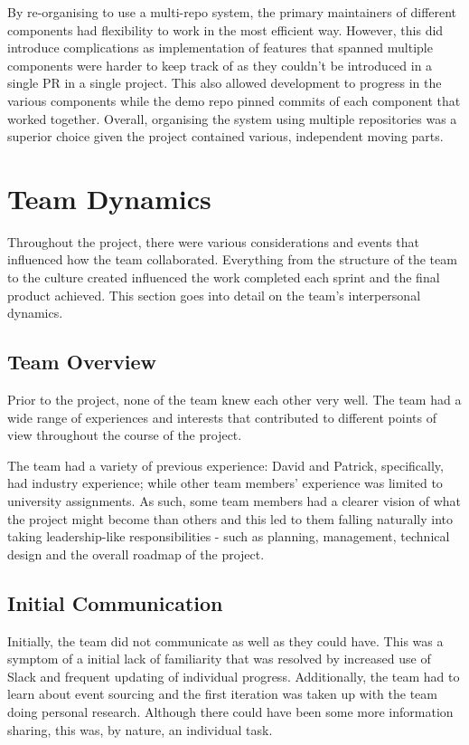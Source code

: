 \documentclass{l3proj}
\begin{document}
By re-organising to use a multi-repo system, the primary maintainers of different components had flexibility to work in the most efficient way. However, this did introduce complications as implementation of features that spanned multiple components were harder to keep track of as they couldn't be introduced in a single PR in a single project. This also allowed development to progress in the various components while the demo repo pinned commits of each component that worked together. Overall, organising the system using multiple repositories was a superior choice given the project contained various, independent moving parts.

\section{Team Dynamics}
\label{sec:team-dynamics}
Throughout the project, there were various considerations and events that influenced how the team collaborated. Everything from the structure of the team to the culture created influenced the work completed each sprint and the final product achieved. This section goes into detail on the team's interpersonal dynamics.

\subsection{Team Overview}
Prior to the project, none of the team knew each other very well. The team had a wide range of experiences and interests that contributed to different points of view throughout the course of the project.

The team had a variety of previous experience: David and Patrick, specifically, had industry experience; while other team members' experience was limited to university assignments. As such, some team members had a clearer vision of what the project might become than others and this led to them falling naturally into taking leadership-like responsibilities - such as planning, management, technical design and the overall roadmap of the project.

\subsection{Initial Communication}
Initially, the team did not communicate as well as they could have. This was a symptom of a initial lack of familiarity that was resolved by increased use of Slack and frequent updating of individual progress. Additionally, the team had to learn about event sourcing and the first iteration was taken up with the team doing personal research. Although there could have been some more information sharing, this was, by nature, an individual task.
\end{document}
